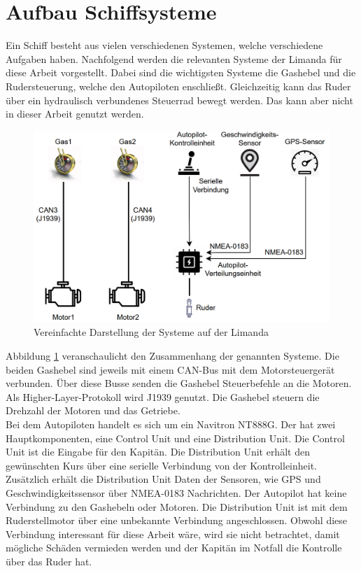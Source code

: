 \section{Aufbau Schiffsysteme}
Ein Schiff besteht aus vielen verschiedenen Systemen, welche verschiedene Aufgaben haben. 
Nachfolgend werden die relevanten Systeme der Limanda für diese Arbeit vorgestellt.
Dabei sind die wichtigsten Systeme die Gashebel und die Rudersteuerung, 
welche den Autopiloten enschließt. Gleichzeitig kann das Ruder über ein hydraulisch verbundenes Steuerrad bewegt werden.
Das kann aber nicht in dieser Arbeit genutzt werden.
\begin{figure}[H]
    \centering
    \includegraphics[scale=0.5]{images/limandaSystem.png}
    \caption{Vereinfachte Darstellung der Systeme auf der Limanda}
    \label{fig:limandaSystem}
\end{figure}
Abbildung \ref{fig:limandaSystem} veranschaulicht den Zusammenhang der genannten Systeme. Die beiden Gashebel sind jeweils
mit einem CAN-Bus mit dem Motorsteuergerät verbunden. Über diese Busse senden die Gashebel Steuerbefehle an die Motoren. 
Als Higher-Layer-Protokoll wird J1939 genutzt. Die Gashebel steuern die Drehzahl der Motoren und das Getriebe.
\\
Bei dem Autopiloten handelt es sich um ein Navitron NT888G. Der hat zwei Hauptkomponenten,
eine Control Unit und eine Distribution Unit. Die Control Unit ist die Eingabe für den Kapitän. Die 
Distribution Unit erhält den gewünschten Kurs über eine serielle Verbindung von der Kontrolleinheit. Zusätzlich erhält die 
Distribution Unit Daten der Sensoren, wie GPS und Geschwindigkeitssensor über NMEA-0183 Nachrichten. 
Der Autopilot hat keine Verbindung zu den Gashebeln oder Motoren. Die Distribution Unit ist mit dem Ruderstellmotor über 
eine unbekannte Verbindung angeschlossen. Obwohl diese Verbindung interessant für diese Arbeit wäre, wird sie nicht betrachtet, 
damit mögliche Schäden vermieden werden und der Kapitän im Notfall die Kontrolle über das Ruder hat.

